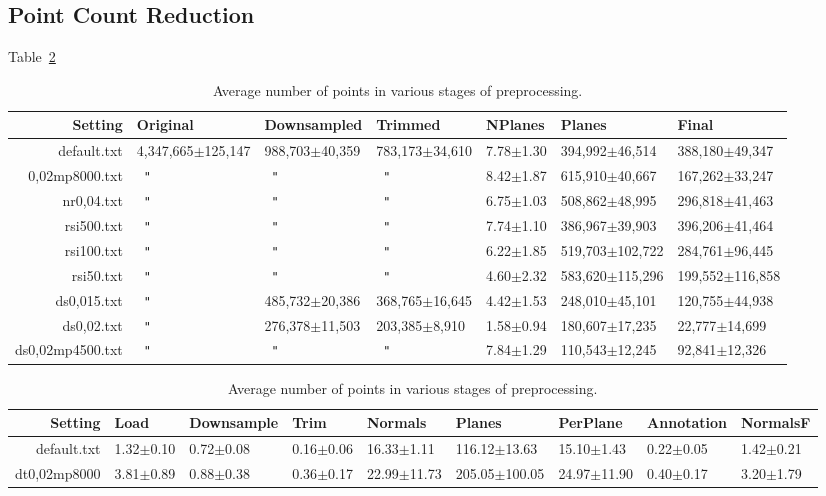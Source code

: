\documentclass[11pt,a4paper]{kth-mag}
\renewcommand{\textquotedbl}{\texttt{"}}
\newcommand{\ditto}[1][.4pt]{\xrfill{#1}~\textquotedbl~\xrfill{#1}}
\begin{document}
\subsection{Point Count Reduction}
Table~\ref{tbl:preprocess_num}
\begin{landscape}
  \begin{table}
    \begin{tabular}{r|llllll}
      Setting & Original & Downsampled & Trimmed & NPlanes & Planes & Final\\\hline
      default.txt & 4,347,665$\pm$125,147 & 988,703$\pm$40,359 & 783,173$\pm$34,610 & 7.78$\pm$1.30 & 394,992$\pm$46,514 & 388,180$\pm$49,347\\
      0,02mp8000.txt & \ditto & \ditto &  \ditto & 8.42$\pm$1.87 & 615,910$\pm$40,667 & 167,262$\pm$33,247\\
      nr0,04.txt & \ditto & \ditto & \ditto & 6.75$\pm$1.03 & 508,862$\pm$48,995 & 296,818$\pm$41,463\\
      rsi500.txt & \ditto & \ditto & \ditto & 7.74$\pm$1.10 & 386,967$\pm$39,903 & 396,206$\pm$41,464\\
      rsi100.txt & \ditto & \ditto & \ditto & 6.22$\pm$1.85 & 519,703$\pm$102,722 & 284,761$\pm$96,445\\
      rsi50.txt & \ditto & \ditto & \ditto & 4.60$\pm$2.32 & 583,620$\pm$115,296 & 199,552$\pm$116,858\\
      ds0,015.txt & \ditto & 485,732$\pm$20,386 & 368,765$\pm$16,645 & 4.42$\pm$1.53 & 248,010$\pm$45,101 & 120,755$\pm$44,938\\
      ds0,02.txt & \ditto & 276,378$\pm$11,503 & 203,385$\pm$8,910 & 1.58$\pm$0.94 & 180,607$\pm$17,235 & 22,777$\pm$14,699\\
      ds0,02mp4500.txt & \ditto & \ditto & \ditto & 7.84$\pm$1.29 & 110,543$\pm$12,245 & 92,841$\pm$12,326
    \end{tabular}
    \caption{Average number of points in various stages of preprocessing.}
    \label{tbl:preprocess_num}
    \begin{tabular}{r|llllllll}
      Setting & Load & Downsample & Trim & Normals & Planes & PerPlane & Annotation & NormalsF \\\hline
      default.txt & 1.32$\pm$0.10 & 0.72$\pm$0.08 & 0.16$\pm$0.06 & 16.33$\pm$1.11 & 116.12$\pm$13.63 & 15.10$\pm$1.43 & 0.22$\pm$0.05 & 1.42$\pm$0.21\\
      dt0,02mp8000 & 3.81$\pm$0.89 & 0.88$\pm$0.38 & 0.36$\pm$0.17 & 22.99$\pm$11.73 & 205.05$\pm$100.05 & 24.97$\pm$11.90 & 0.40$\pm$0.17 & 3.20$\pm$1.79\\

\end{tabular}
\end{table}
\end{landscape}
\end{document}

